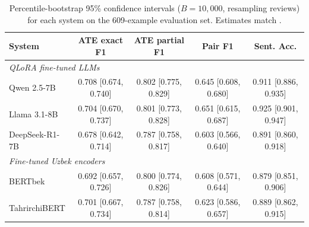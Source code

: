\documentclass[bdcc,article,submit,moreauthors]{Definitions/mdpi}
\begin{document}
\begin{table}[H]
\centering
\caption{Percentile-bootstrap 95\% confidence intervals ($B{=}10{,}000$, resampling reviews) for each system on the 609-example evaluation set. Estimates match .\label{tab:cis}}
\setlength{\tabcolsep}{3pt}
\footnotesize
\begin{tabular}{lcccc}
\toprule
\textbf{System} & \textbf{ATE exact F1} & \textbf{ATE partial F1} & \textbf{Pair F1} & \textbf{Sent. Acc.} \\
\midrule
\multicolumn{5}{l}{\textit{QLoRA fine-tuned LLMs}} \\
Qwen 2.5-7B      & 0.708 [0.674, 0.740] & 0.802 [0.775, 0.829] & 0.645 [0.608, 0.680] & 0.911 [0.886, 0.935] \\
Llama 3.1-8B     & 0.704 [0.670, 0.737] & 0.801 [0.773, 0.828] & 0.651 [0.615, 0.687] & 0.925 [0.901, 0.947] \\
DeepSeek-R1-7B   & 0.678 [0.642, 0.714] & 0.787 [0.758, 0.817] & 0.603 [0.566, 0.640] & 0.891 [0.860, 0.918] \\
\midrule
\multicolumn{5}{l}{\textit{Fine-tuned Uzbek encoders}} \\
BERTbek          & 0.692 [0.657, 0.726] & 0.800 [0.774, 0.826] & 0.608 [0.571, 0.644] & 0.879 [0.851, 0.906] \\
TahrirchiBERT    & 0.701 [0.667, 0.734] & 0.787 [0.758, 0.814] & 0.623 [0.586, 0.657] & 0.889 [0.862, 0.915] \\
\bottomrule
\end{tabular}
\end{table}
\end{document}
